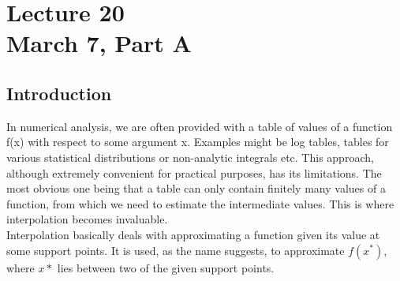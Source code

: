 \chapter*{Lecture 20 \\ March 7, Part A}
\setcounter{chapter}{20}
\setcounter{section}{0}

\section{Introduction}

In numerical analysis, we are often provided with a table of values of a function f(x) with respect to some argument x. Examples might be log tables, tables for various statistical distributions or non-analytic integrals etc. This approach, although extremely convenient for practical purposes, has its limitations. The most obvious one being that a table can only contain finitely many values of a function, from which we need to estimate the intermediate values. This is where interpolation becomes invaluable.\\

Interpolation basically deals with approximating a function given its value at some support points. It is used, as the name suggests, to approximate $f(x^*)$, where $x*$ lies between two of the given support points.
